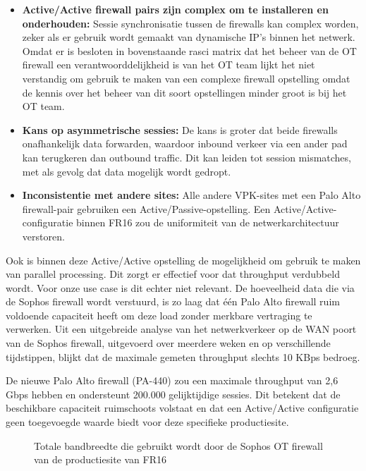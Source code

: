 \begin{itemize}
    \item \textbf{Active/Active firewall pairs zijn complex om te installeren en onderhouden:}  Sessie synchronisatie tussen de firewalls kan complex worden, zeker als er gebruik wordt gemaakt van dynamische IP’s binnen het netwerk. Omdat er is besloten in bovenstaande rasci matrix dat het beheer van de OT firewall een verantwoorddelijkheid is van het OT team lijkt het niet verstandig om gebruik te maken van een complexe firewall opstelling omdat de kennis over het beheer van dit soort opstellingen minder groot is bij het OT team. 
    
    \item \textbf{Kans op asymmetrische sessies:} De kans is groter dat beide firewalls onafhankelijk data forwarden, waardoor inbound verkeer via een ander pad kan terugkeren dan outbound traffic. Dit kan leiden tot session mismatches, met als gevolg dat data mogelijk wordt gedropt.
    
    \item \textbf{Inconsistentie met andere sites:}  Alle andere VPK-sites met een Palo Alto firewall-pair gebruiken een Active/Passive-opstelling. Een Active/Active-configuratie binnen FR16 zou de uniformiteit van de netwerkarchitectuur verstoren.

\end{itemize}

\newpage

Ook is binnen deze Active/Active opstelling de mogelijkheid om gebruik te maken van parallel processing. Dit zorgt er effectief voor dat throughput verdubbeld wordt. \autocite{Fulp2006} Voor onze use case is dit echter niet relevant. De hoeveelheid data die via de Sophos firewall wordt verstuurd, is zo laag dat één Palo Alto firewall ruim voldoende capaciteit heeft om deze load zonder merkbare vertraging te verwerken. Uit een uitgebreide analyse van het netwerkverkeer op de WAN poort van de Sophos firewall, uitgevoerd over meerdere weken en op verschillende tijdstippen, blijkt dat de maximale gemeten throughput slechts 10 KBps bedroeg.


De nieuwe Palo Alto firewall (PA-440) zou een maximale throughput van 2,6 Gbps hebben en ondersteunt 200.000 gelijktijdige sessies. \autocite{PaloAltoDS2025} Dit betekent dat de beschikbare capaciteit ruimschoots volstaat en dat een Active/Active configuratie geen toegevoegde waarde biedt voor deze specifieke productiesite.

\begin{figure}[H]
    \centering
    \caption[Sophos firewall bandwidth graph]{\label{fig:grail}Totale bandbreedte die gebruikt wordt door de Sophos OT firewall van de productiesite van FR16}
\end{figure}




